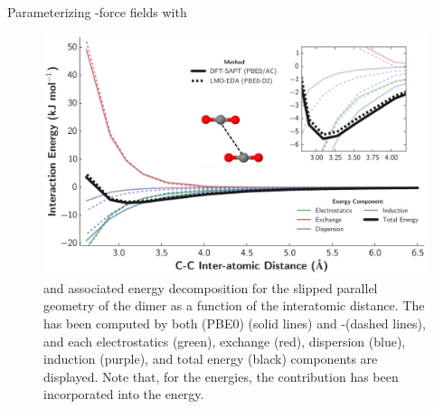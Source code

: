 \begin{section}{Parameterizing \cus-\mof force fields with \lmoeda}
    \begin{figure}
    \centering
    \includegraphics[width=1.0\textwidth]{lmoeda/co2_co2_pes.pdf}
    \caption[\lmoeda vs. \sapt \pes for the \co dimer]
{\pes and associated energy decomposition for the slipped parallel geometry of
the \co dimer as a function of
the  interatomic distance. The \pes has been
computed by both \dftsapt(PBE0) (solid lines) and \lmoeda-\pbeod (dashed
lines), and each electrostatics (green), exchange (red), dispersion (blue),
induction (purple), and total energy (black) components are displayed.
Note that, for the \dftsapt energies, the \dhf contribution has been
incorporated into the \induction energy.
            }
    \label{fig:lmoeda-co2_co2}
    \end{figure}


\end{section}
